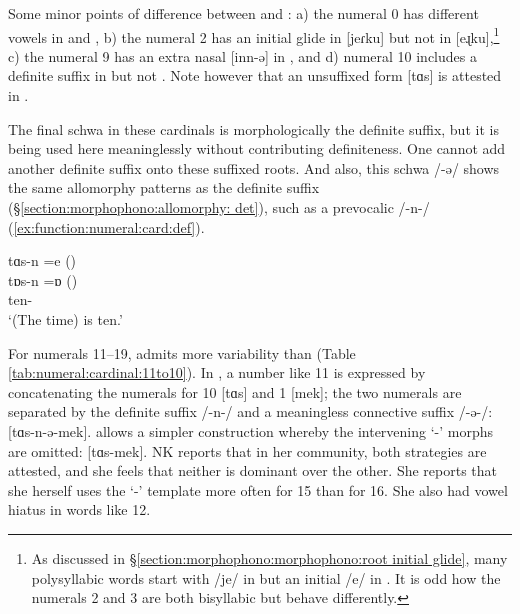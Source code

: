 Some minor points of difference between {\seaSE} and {\iaIA}:
a) the numeral 0 has different vowels in {\seaAbbre}    and  {\iaAbbre}, b) the numeral 2 has an initial glide in {\seaAbbre} [jeɾku]  but not  in {\iaAbbre}  [eɻku],\footnote{As discussed in \S\ref{section:morphophono:morphophono:root initial glide}, many polysyllabic words start with /je/ in {\seaAbbre} but an initial /e/ in {\iaAbbre}. It is odd how the numerals 2 and 3 are both bisyllabic but behave differently. }    c) the numeral 9 has an extra nasal  [inn-ə]  in {\iaAbbre}, and d) numeral 10 includes a definite suffix in {\seaAbbre} but not {\iaAbbre}. Note however that an unsuffixed form [tɑs]  is attested in {\seaCEA}.

 The final schwa in these cardinals is morphologically the definite suffix, but it is being used here meaninglessly without contributing definiteness. One cannot add another definite suffix onto  these suffixed roots. And also, this schwa /-ə/ shows the same allomorphy patterns as the definite suffix (\S\ref{section:morphophono:allomorphy: det}), such as a prevocalic /-n-/ (\ref{ex:function:numeral:card:def}). 

\begin{exe}
	\ex \label{ex:function:numeral:card:def} \glll tɑs-n =e ({\seaAbbre}) \\
	 tɒs-n =ɒ ({\iaAbbre}) \\
	ten-{} {\auxgloss} \\
	\trans `(The time) is ten.'\\
\end{exe}\largerpage[-1]

For numerals 11–19, {\iaIA} admits more variability than {\seaSEA} (Table \ref{tab:numeral:cardinal:11to10}). In {\seaSEA}, a number like 11 is expressed by concatenating the numerals for 10  [tɑs]  and 1  [mek]; the two numerals are separated by the definite suffix /-n-/ and a meaningless connective suffix /-ə-/: [tɑs-n-ə-mek]. {\seaCEA} allows   a simpler construction whereby the intervening `{}-{\con}' morphs are omitted: [tɑs-mek]. NK reports that in her {\iaIA} community, both strategies are attested, and she feels that neither is dominant over the other. She   reports that she herself uses the `{}-{\con}' template  more often for 15 than for   16.   She also had vowel hiatus in words like 12.


